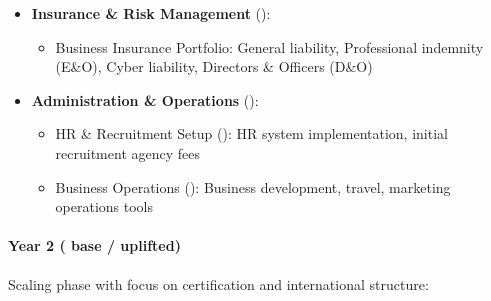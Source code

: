 \documentclass[11pt, a4paper, oneside]{article}
\begin{document}
\begin{itemize}
    \item \textbf{Insurance \& Risk Management} ():
    \begin{itemize}
        \item Business Insurance Portfolio: General liability, Professional indemnity (E\&O), Cyber liability, Directors \& Officers (D\&O)
    \end{itemize}
    
    \item \textbf{Administration \& Operations} ():
    \begin{itemize}
        \item HR \& Recruitment Setup (): HR system implementation, initial recruitment agency fees
        \item Business Operations (): Business development, travel, marketing operations tools
    \end{itemize}
\end{itemize}

\paragraph{Year 2 ( base /  uplifted)}
Scaling phase with focus on certification and international structure:
\end{document}
